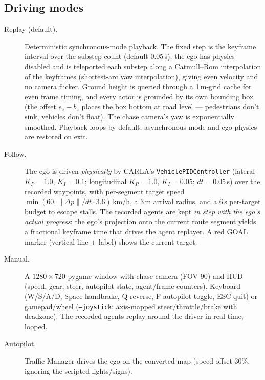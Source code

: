 \documentclass[11pt]{article}
\newcommand{\code}[1]{{\setlength{\fboxsep}{1.5pt}\colorbox{codegray}{\small\texttt{#1}}}}
\begin{document}
\subsection{Driving modes}
\begin{description}
\item[Replay (default).] Deterministic synchronous-mode playback. The fixed step is
      the keyframe interval over the substep count (default 0.05\,s); the ego has physics
      disabled and is teleported each substep along a Catmull--Rom interpolation of the
      keyframes (shortest-arc yaw interpolation), giving even velocity and no camera
      flicker. Ground height is queried through a 1\,m-grid cache for even frame
      timing, and every actor is grounded by its own bounding box (the offset
      $e_z - b_z$ places the box bottom at road level --- pedestrians don't sink,
      vehicles don't float). The chase camera's yaw is exponentially smoothed.
      Playback loops by default; asynchronous mode and ego physics are restored on
      exit.
\item[Follow.] The ego is driven \emph{physically} by CARLA's
      \code{VehiclePIDController} (lateral $K_P{=}1.0$, $K_I{=}0.1$; longitudinal
      $K_P{=}1.0$, $K_I{=}0.05$; $dt=0.05$\,s) over the recorded waypoints, with
      per-segment target speed $\min(60, \|\Delta p\|/\mathit{dt}\cdot3.6)$\,km/h, a
      3\,m arrival radius, and a 6\,s per-target budget to escape stalls. The recorded
      agents are kept \emph{in step with the ego's actual progress}: the ego's
      projection onto the current route segment yields a fractional keyframe time that
      drives the agent replayer. A red GOAL marker (vertical line + label) shows the
      current target.
\item[Manual.] A $1280\times720$ pygame window with chase camera (FOV 90) and HUD
      (speed, gear, steer, autopilot state, agent/frame counters). Keyboard (W/S/A/D,
      Space handbrake, Q reverse, P autopilot toggle, ESC quit) or gamepad/wheel
      (\code{--joystick}: axis-mapped steer/throttle/brake with deadzone). The recorded
      agents replay around the driver in real time, looped.
\item[Autopilot.] Traffic Manager drives the ego on the converted map (speed offset
      30\%, ignoring the scripted lights/signs).
\end{description}
\end{document}
